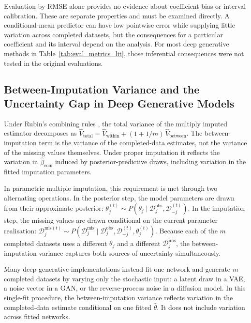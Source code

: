 Evaluation by RMSE alone provides no evidence about coefficient bias or interval calibration. These are separate properties and must be examined directly. A conditional-mean predictor can have low pointwise error while supplying little variation across completed datasets, but the consequences for a particular coefficient and its interval depend on the analysis. For most deep generative methods in Table~\ref{tab:eval_metrics_lit}, those inferential consequences were not tested in the original evaluations.

\subsection{Between-Imputation Variance and the Uncertainty Gap in Deep Generative Models}
\label{sec:uncertainty_gap}

Under Rubin's combining rules \citep{Rubin1987}, the total variance of the multiply imputed estimator decomposes as $\hat{V}_{\mathrm{total}} = \hat{V}_{\mathrm{within}} + (1 + 1/m)\, \hat{V}_{\mathrm{between}}$. The between-imputation term is the variance of the completed-data estimates, not the variance of the missing values themselves. Under proper imputation it reflects the variation in $\hat{\beta}_{\mathrm{com}}$ induced by posterior-predictive draws, including variation in the fitted imputation parameters.

In parametric multiple imputation, this requirement is met through two alternating operations. In the posterior step, the model parameters are drawn from their approximate posterior: $\theta_j^{(t)} \sim P(\theta_j \mid \mathcal{D}_j^{\mathrm{obs}}, \mathcal{D}_{-j}^{(t)})$. In the imputation step, the missing values are drawn conditional on the current parameter realisation: $\mathcal{D}_j^{\mathrm{mis}(t)} \sim P(\mathcal{D}_j^{\mathrm{mis}} \mid \mathcal{D}_j^{\mathrm{obs}}, \mathcal{D}_{-j}^{(t)}, \theta_j^{(t)})$. Because each of the $m$ completed datasets uses a different $\theta_j$ and a different $\mathcal{D}_j^{\mathrm{mis}}$, the between-imputation variance captures both sources of uncertainty simultaneously.

Many deep generative implementations instead fit one network and generate $m$ completed datasets by varying only the stochastic input: a latent draw in a VAE, a noise vector in a GAN, or the reverse-process noise in a diffusion model. In this single-fit procedure, the between-imputation variance reflects variation in the completed-data estimate conditional on one fitted $\hat{\theta}$. It does not include variation across fitted networks.

